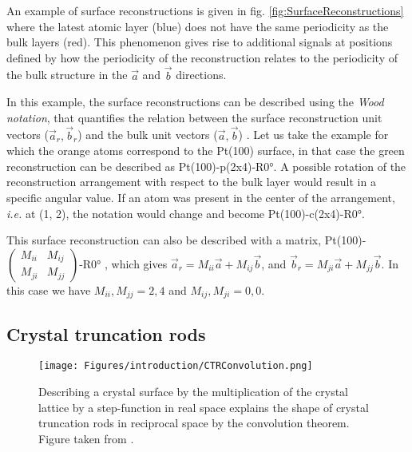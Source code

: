 An example of surface reconstructions is given in fig. \ref{fig:SurfaceReconstructions} where the latest atomic layer (blue) does not have the same periodicity as the bulk layers (red).
This phenomenon gives rise to additional signals at positions defined by how the periodicity of the reconstruction relates to the periodicity of the bulk structure in the $\vec{a}$ and $\vec{b}$ directions.

In this example, the surface reconstructions can be described using the \textit{Wood notation}, that quantifies the relation between the surface reconstruction unit vectors ($\vec{a}_r, \vec{b}_r$) and the bulk unit vectors ($\vec{a}, \vec{b}$) \parencite{Wood1964, Unertl1996, Goncharova2018}.
Let us take the example for which the orange atoms correspond to the Pt(100) surface, in that case the green reconstruction can be described as Pt(100)-p(2x4)-R\ang{0}.
A possible rotation of the reconstruction arrangement with respect to the bulk layer would result in a specific angular value.
If an atom was present in the center of the  arrangement, \textit{i.e.} at (1, 2), the notation would change and become Pt(100)-c(2x4)-R\ang{0}.

This surface reconstruction can also be described with a matrix, Pt(100)-
$\begin{pmatrix}
  M_{ii} & M_{ij}\\
  M_{ji} & M_{jj}
\end{pmatrix}$-R\ang{0}
, which gives $\vec{a}_r = M_{ii} \vec{a} + M_{ij} \vec{b}$, and  $\vec{b}_r = M_{ji} \vec{a} + M_{jj} \vec{b}$.
In this case we have $M_{ii}, M_{jj} = 2, 4$ and $M_{ij}, M_{ji} = 0, 0$.

\subsection{Crystal truncation rods} \label{sec:CTR}

\begin{figure}[!htb]
    \centering
    \texttt{[image: Figures/introduction/CTRConvolution.png]}
    \caption{
    Describing a crystal surface by the multiplication of the crystal lattice by a step-function in real space explains the shape of crystal truncation rods in reciprocal space by the convolution theorem.
    Figure taken from \cite{Willmott}.
    }
    \label{fig:CTRConvolution}
\end{figure}

